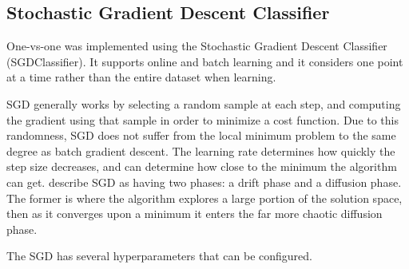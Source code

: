 \documentclass[12pt]{article}
\begin{document}
\subsection{Stochastic Gradient Descent Classifier}

One-vs-one was implemented using the Stochastic Gradient Descent Classifier (SGDClassifier). It supports online and batch learning and it considers one point at a time rather than the entire dataset when learning.

SGD generally works by selecting a random sample at each step, and computing the gradient using that sample in order to minimize a cost function. Due to this randomness, SGD does not suffer from the local minimum problem to the same degree as batch gradient descent. The learning rate determines how quickly the step size decreases, and can determine how close to the minimum the algorithm can get. \cite{sgd} describe SGD as having two phases: a drift phase and a diffusion phase. The former is where the algorithm explores a large portion of the solution space, then as it converges upon a minimum it enters the far more chaotic diffusion phase. 

The SGD has several hyperparameters that can be configured. 
\end{document}
